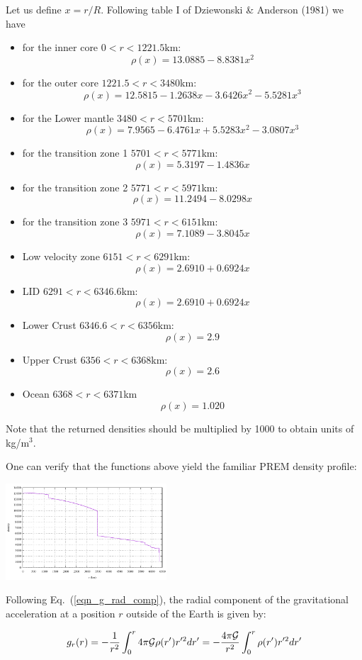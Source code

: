 
Let us define $x=r/R$.
Following table I of Dziewonski \& Anderson (1981) \cite{dzan81} 
we have 

\begin{itemize}
\item for the inner core $0<r<1221.5\si{\km}$:
\[
\rho(x) =13.0885-8.8381 x^2
\]
\item for the outer core $1221.5<r<3480$km:
\[
\rho(x)=12.5815-1.2638x-3.6426x^2-5.5281x^3
\]
\item for the Lower mantle $3480<r<5701$km:
\[
\rho(x)=7.9565-6.4761x+5.5283x^2-3.0807x^3
\]
\item for the transition zone 1 $5701<r<5771$km:
\[
\rho(x)=5.3197-1.4836x
\]
\item for the transition zone 2 $5771<r<5971$km:
\[
\rho(x)=11.2494-8.0298x
\]
\item for the transition zone 3 $5971<r<6151$km:
\[
\rho(x)=7.1089-3.8045x
\]
\item Low velocity zone $6151<r<6291$km:
\[
\rho(x)=2.6910+0.6924x
\]
\item LID  $6291<r<6346.6$km:
\[
\rho(x)=2.6910+0.6924x
\]
\item Lower Crust $6346.6<r<6356$km:
\[
\rho(x)=2.9
\]
\item Upper Crust $6356<r<6368$km:
\[
\rho(x)=2.6
\]
\item Ocean $6368<r<6371$km
\[
\rho(x)=1.020
\]
\end{itemize}

\noindent Note that the returned densities should be multiplied by 1000 to obtain 
units of kg/m$^3$.

One can verify that the functions above yield the familiar PREM density profile:
\begin{center}
\includegraphics[width=6cm]{images/prem/rho.pdf}
\end{center}

Following Eq.~(\ref{eqn_g_rad_comp}), the radial component of the gravitational 
acceleration at a position $r$ outside of the Earth is given by:

\begin{equation}
g_r(r) 
= - \frac{1}{r^2} \int_0^r 4\pi {\cal G} \rho(r') r'^2 dr'
= - \frac{4 \pi {\cal G}}{r^2} \int_0^r \rho(r') r'^2 dr'
\end{equation}
 
